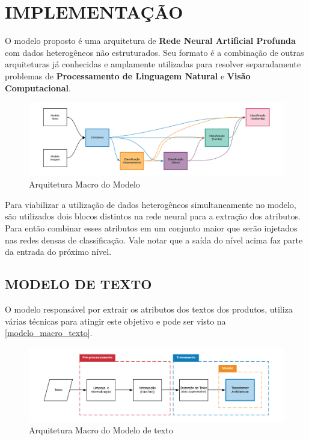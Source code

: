 \chapter{IMPLEMENTAÇÃO}

O modelo proposto é uma arquitetura de \textbf{Rede Neural Artificial Profunda} com dados heterogêneos não estruturados. Seu formato é a combinação de outras arquiteturas já conhecidas e amplamente utilizadas para resolver separadamente problemas de \textbf{Processamento de Linguagem Natural} e \textbf{Visão Computacional}.

\begin{figure}[htb]
	\caption{\label{arquitetura_macro_do_modelo} Arquitetura Macro do Modelo}
	\begin{center}
	    \includegraphics[width=\textwidth]{artigo/recursos/imagens/arquitetura_macro_do_modelo.png}
	\end{center}
\end{figure}

Para viabilizar a utilização de dados heterogêneos simultaneamente no modelo, são utilizados dois blocos distintos na rede neural para a extração dos atributos. Para então combinar esses atributos em um conjunto maior que serão injetados nas redes densas de classificação. Vale notar que a saída do nível acima faz parte da entrada do próximo nível.

\section{MODELO DE TEXTO}

O modelo responsável por extrair os atributos dos textos dos produtos, utiliza várias técnicas para atingir este objetivo e pode ser visto na \autoref{modelo_macro_texto}.

\begin{figure}[htb]
	\caption{\label{modelo_macro_texto} Arquitetura Macro do Modelo de texto}
	\begin{center}
	    \includegraphics[width=\textwidth]{artigo/recursos/imagens/modelo_macro_texto.png}
	\end{center}
\end{figure}


